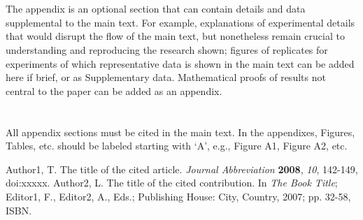 \documentclass[journal,article,submit,moreauthors,pdftex,10pt,a4paper]{Definitions/mdpi}
\theoremstyle{plain}
\theoremstyle{definition}
\theoremstyle{remark}
\begin{document}
\begin{steps}
\section{}
\unskip
\subsection{}
The appendix is an optional section that can contain details and data supplemental to the main text. For example, explanations of experimental details that would disrupt the flow of the main text, but nonetheless remain crucial to understanding and reproducing the research shown; figures of replicates for experiments of which representative data is shown in the main text can be added here if brief, or as Supplementary data. Mathematical proofs of results not central to the paper can be added as an appendix.

\section{}
All appendix sections must be cited in the main text. In the appendixes, Figures, Tables, etc. should be labeled starting with `A', e.g., Figure A1, Figure A2, etc. 


\begin{thebibliography}{999}
Author1, T. The title of the cited article. {\em Journal Abbreviation} {\bf 2008}, {\em 10}, 142-149, doi:xxxxx.
Author2, L. The title of the cited contribution. In {\em The Book Title}; Editor1, F., Editor2, A., Eds.; Publishing House: City, Country, 2007; pp. 32-58, ISBN.
\end{thebibliography}



\end{steps}
\end{document}
